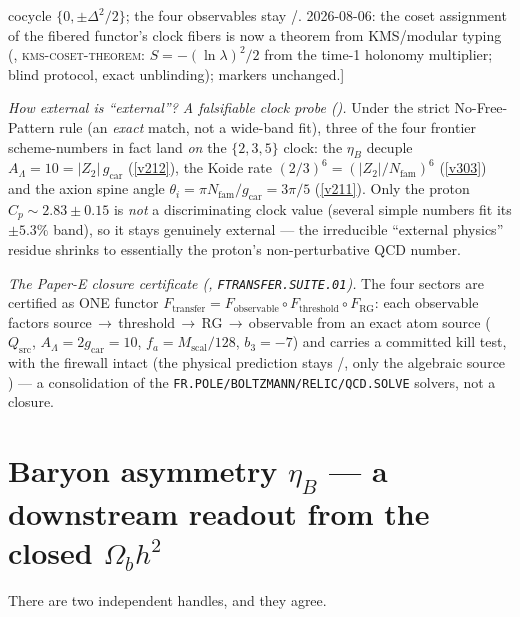 \begin{gapbox}
cocycle $\{0,\pm\Delta^2/2\}$; the four observables stay \mC/\mO.  2026-08-06: the coset assignment of the
fibered functor's clock fibers is now a theorem from KMS/modular typing
(, \textsc{kms-coset-theorem}: $S=-(\ln\lambda)^2/2$ from the time-1
holonomy multiplier; blind protocol, exact unblinding); markers unchanged.]
\par\smallskip\noindent\emph{How external is ``external''? A falsifiable clock probe ().}
Under the strict No-Free-Pattern rule (an \emph{exact} match, not a wide-band fit), three of the four frontier
scheme-numbers in fact land \emph{on} the $\{2,3,5\}$ clock: the $\eta_B$ decuple $A_\Lambda=10=|Z_2|\,g_{\mathrm{car}}$
(\vref{v212}), the Koide rate $(2/3)^6=(|Z_2|/N_{\mathrm{fam}})^6$ (\vref{v303}) and the axion spine angle
$\theta_i=\pi N_{\mathrm{fam}}/g_{\mathrm{car}}=3\pi/5$ (\vref{v211}). Only the proton $C_p\sim2.83\pm0.15$ is \emph{not} a discriminating
clock value (several simple numbers fit its $\pm5.3\%$ band), so it stays genuinely external --- the irreducible
``external physics'' residue shrinks to essentially the proton's non-perturbative QCD number.
\par\smallskip\noindent\emph{The Paper-E closure certificate (, \texttt{FTRANSFER.SUITE.01}).}
The four sectors are certified as ONE functor $F_{\mathrm{transfer}}=F_{\mathrm{observable}}\circ F_{\mathrm{threshold}}\circ F_{\mathrm{RG}}$:
each observable factors source\,$\to$\,threshold\,$\to$\,RG\,$\to$\,observable from an exact atom source ($Q_{\mathrm{src}}$,
$A_\Lambda=2g_{\mathrm{car}}=10$, $f_a=M_{\mathrm{scal}}/128$, $b_3=-7$) and carries a committed kill test, with the firewall
intact (the physical prediction stays \mC/\mO, only the algebraic source \mE) --- a consolidation of the
\texttt{FR.POLE/BOLTZMANN/RELIC/QCD.SOLVE} solvers, not a closure.
\end{gapbox}

\section{Baryon asymmetry $\eta_B$ --- a downstream readout from the closed $\Omega_b h^2$}
There are two independent handles, and they agree.

